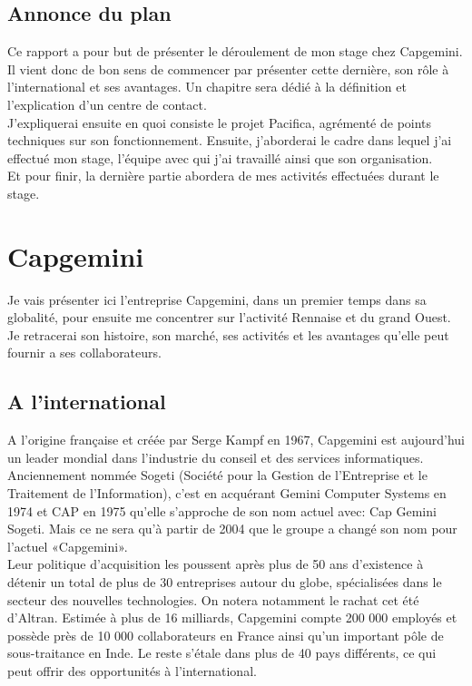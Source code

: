 \documentclass{rapport}
\begin{document}
\subsection*{Annonce du plan}

Ce rapport a pour but de présenter le déroulement de mon stage chez Capgemini. Il vient donc de bon sens de commencer par présenter cette dernière, son rôle à l'international et ses avantages.
Un chapitre sera dédié à la définition et l'explication d'un centre de contact.\\
J'expliquerai ensuite en quoi consiste le projet Pacifica, agrémenté de points techniques sur son fonctionnement.
Ensuite, j'aborderai le cadre dans lequel j'ai effectué mon stage, l'équipe avec qui j'ai travaillé ainsi que son organisation.\\
Et pour finir, la dernière partie abordera de mes activités effectuées durant le stage.

\newpage

\section{Capgemini}

Je vais présenter ici l'entreprise Capgemini, dans un premier temps dans sa globalité, pour ensuite me concentrer sur l’activité Rennaise et du grand Ouest. Je retracerai son histoire, son marché, ses activités et les avantages qu'elle peut fournir a ses collaborateurs.

\subsection{A l'international}

A l'origine française et créée par Serge Kampf en 1967, Capgemini est aujourd'hui un leader mondial dans l'industrie du conseil et des services informatiques. Anciennement nommée Sogeti (Société pour la Gestion de l'Entreprise et le Traitement de l'Information), c'est en acquérant Gemini Computer Systems en 1974 et CAP en 1975 qu'elle s'approche de son nom actuel avec: Cap Gemini Sogeti. Mais ce ne sera qu'à partir de 2004 que le groupe a changé son nom pour l'actuel «Capgemini».\\

Leur politique d'acquisition les poussent après plus de 50 ans d'existence à détenir un total de plus de 30 entreprises autour du globe, spécialisées dans le secteur des nouvelles technologies. On notera notamment le rachat cet été d'Altran.
Estimée à plus de 16 milliards, Capgemini compte 200 000 employés et possède près de 10 000 collaborateurs en France ainsi qu'un important pôle de sous-traitance en Inde. Le reste s’étale dans plus de 40 pays différents, ce qui peut offrir des opportunités à l'international.
\end{document}
